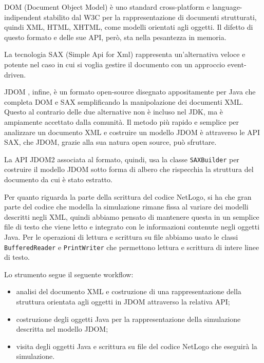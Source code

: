 DOM (Document Object Model) è uno standard cross-platform e language-indipendent stabilito dal W3C per la rappresentazione di documenti strutturati, quindi XML, HTML, XHTML, come modelli orientati agli oggetti. Il difetto di questo formato e delle sue API, però, sta nella pesantezza in memoria.

La tecnologia SAX (Simple Api for Xml) rappresenta un'alternativa veloce e potente nel caso in cui si voglia gestire il documento con un approccio event-driven.

JDOM \cite{jdom}, infine, è un formato open-source disegnato appositamente per Java che completa DOM e SAX semplificando la manipolazione dei documenti XML. Questo al contrario delle due alternative non è incluso nel JDK, ma è ampiamente accettato dalla comunità. Il metodo più rapido e semplice per analizzare un documento XML e costruire un modello JDOM è attraverso le API SAX, che JDOM, grazie alla sua natura open source, può sfruttare.

La API JDOM2 associata al formato, quindi, usa la classe \texttt{SAXBuilder} \cite{sax-builder} per costruire il modello JDOM sotto forma di albero che rispecchia la struttura del documento da cui è stato estratto. 

Per quanto riguarda la parte della scrittura del codice NetLogo, si ha che gran parte del codice che modella la simulazione rimane fissa al variare dei modelli descritti negli XML, quindi abbiamo pensato di mantenere questa in un semplice file di testo che viene letto e integrato con le informazioni contenute negli oggetti Java. Per le operazioni di lettura e scrittura su file abbiamo usato le classi \texttt{BufferedReader} \cite{buffered-reader} e \texttt{PrintWriter} \cite{print-writer} che permettono lettura e scrittura di intere linee di testo.

Lo strumento segue il seguente workflow:
\begin{itemize}
\item analisi del documento XML e costruzione di una rappresentazione della struttura orientata agli oggetti in JDOM attraverso la relativa API;
\item costruzione degli oggetti Java per la rappresentazione della simulazione descritta nel modello JDOM;
\item visita degli oggetti Java e scrittura su file del codice NetLogo che eseguirà la simulazione.
\end{itemize}

